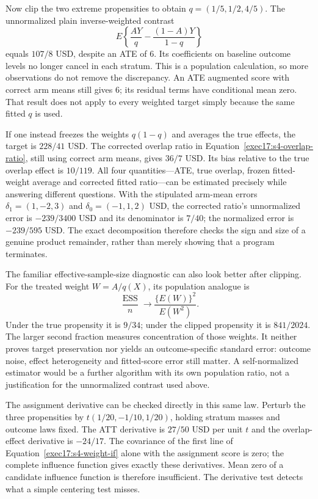 Now clip the two extreme propensities to obtain
$q=(1/5,1/2,4/5)$. The unnormalized plain inverse-weighted contrast
\[
 E\left\{\frac{AY}{q}-\frac{(1-A)Y}{1-q}\right\}
\]
equals $107/8$ USD, despite an ATE of $6$. Its coefficients on baseline
outcome levels no longer cancel in each stratum. This is a population
calculation, so more observations do not remove the discrepancy. An ATE
augmented score with correct arm means still gives $6$; its residual terms
have conditional mean zero. That result does not apply to every weighted
target simply because the same fitted $q$ is used.

If one instead freezes the weights $q(1-q)$ and averages the true effects,
the target is $228/41$ USD. The corrected overlap ratio in
Equation~\eqref{exec17:s4-overlap-ratio}, still using correct arm means,
gives $36/7$ USD. Its bias relative to the true overlap effect is $10/119$.
All four quantities---ATE, true overlap, frozen fitted-weight average and
corrected fitted ratio---can be estimated precisely while answering different
questions. With the stipulated arm-mean errors
$\delta_1=(1,-2,3)$ and $\delta_0=(-1,1,2)$ USD, the corrected ratio's
unnormalized error is $-239/3400$ USD and its denominator is $7/40$;
the normalized error is $-239/595$ USD. The exact decomposition therefore
checks the sign and size of a genuine product remainder, rather than merely
showing that a program terminates.~\citep{exec17_s4_math}

The familiar effective-sample-size diagnostic can also look better after
clipping. For the treated weight $W=A/q(X)$, its population analogue is
\[
 \frac{\operatorname{ESS}}{n}\longrightarrow
       \frac{\{E(W)\}^2}{E(W^2)}.
\]
Under the true propensity it is $9/34$; under the clipped propensity it is
$841/2024$. The larger second fraction measures concentration of those
weights. It neither proves target preservation nor yields an outcome-specific
standard error: outcome noise, effect heterogeneity and fitted-score error
still matter. A self-normalized estimator would be a further algorithm with
its own population ratio, not a justification for the unnormalized contrast
used above.

The assignment derivative can be checked directly in this same law. Perturb
the three propensities by $t(1/20,-1/10,1/20)$, holding stratum masses and
outcome laws fixed. The ATT derivative is $27/50$ USD per unit $t$ and the
overlap-effect derivative is $-24/17$. The covariance of the first line of
Equation~\eqref{exec17:s4-weight-if} alone with the assignment score is zero;
the complete influence function gives exactly these derivatives. Mean zero
of a candidate influence function is therefore insufficient. The derivative
test detects what a simple centering test misses.~\citep{exec17_s4_math}

